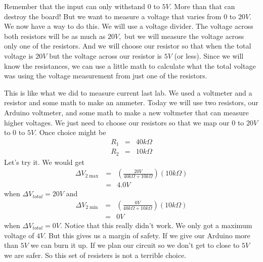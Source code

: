 Remember that the input can only withstand $0$ to $5\unit{V}.$ More than
that can destroy the board! But we want to measure a voltage that varies
from $0$ to $20\unit{V}.$ We now have a way to do this. We will use a
voltage divider. The voltage across both resistors will be as much as $20%
\unit{V},$ but we will measure the voltage across only one of the resistors.
And we will choose our resistor so that when the total voltage is $20\unit{V}
$ but the voltage across our resistor is $5\unit{V}$ (or less). Since we
will know the resistances, we can use a little math to calculate what the
total voltage was using the voltage measurement from just one of the
resistors.

This is like what we did to measure current last lab. We used a voltmeter
and a resistor and some math to make an ammeter. Today we will use two
resistors, our Arduino voltmeter, and some math to make a new voltmeter that
can measure higher voltages. We just need to choose our resistors so that we
map our $0$ to $20\unit{V}$ to $0$ to $5\unit{V}.$ Once choice might be 
\begin{eqnarray*}
R_{1} &=&40\unit{k%
\Omega%
} \\
R_{2} &=&10\unit{k%
\Omega%
}
\end{eqnarray*}%
Let's try it. We would get%
\begin{eqnarray*}
\Delta V_{2\max } &=&\left( \frac{20\unit{V}}{40\unit{k%
\Omega%
}+10\unit{k%
\Omega%
}}\right) \left( 10\unit{k%
\Omega%
}\right) \\
&=&4.0\unit{V}
\end{eqnarray*}%
when $\Delta V_{total}=20\unit{V}$ and 
\begin{eqnarray*}
\Delta V_{2\min } &=&\left( \frac{0\unit{V}}{40\unit{k%
\Omega%
}+10\unit{k%
\Omega%
}}\right) \left( 10\unit{k%
\Omega%
}\right) \\
&=&0\unit{V}
\end{eqnarray*}%
when $\Delta V_{total}=0\unit{V}.$ Notice that this really didn't work. We
only got a maximum voltage of $4\unit{V}.$ But this gives us a margin of
safety. If we give our Arduino more than $5\unit{V}$ we can burn it up. If
we plan our circuit so we don't get to close to $5\unit{V}$ we are safer. So
this set of resisters is not a terrible choice.

